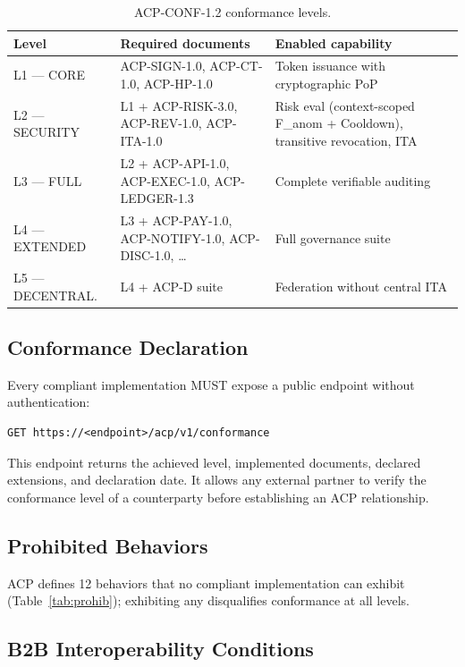 \documentclass[11pt]{article}
\theoremstyle{definition}
\begin{document}
\begin{table}[h!]
\centering
\small
\begin{tabular}{@{}lp{5.2cm}p{3.8cm}@{}}
\toprule
\textbf{Level} & \textbf{Required documents} & \textbf{Enabled capability} \\
\midrule
L1 --- CORE & ACP-SIGN-1.0, ACP-CT-1.0, ACP-HP-1.0 & Token issuance with cryptographic PoP \\
L2 --- SECURITY & L1 + ACP-RISK-3.0, ACP-REV-1.0, ACP-ITA-1.0 & Risk eval (context-scoped F\_anom + Cooldown), transitive revocation, ITA \\
L3 --- FULL & L2 + ACP-API-1.0, ACP-EXEC-1.0, ACP-LEDGER-1.3 & Complete verifiable auditing \\
L4 --- EXTENDED & L3 + ACP-PAY-1.0, ACP-NOTIFY-1.0, ACP-DISC-1.0, \ldots & Full governance suite \\
L5 --- DECENTRAL. & L4 + ACP-D suite & Federation without central ITA \\
\bottomrule
\end{tabular}
\caption{ACP-CONF-1.2 conformance levels.}
\end{table}

\subsection{Conformance Declaration}

Every compliant implementation MUST expose a public endpoint without authentication:
\begin{lstlisting}
GET https://<endpoint>/acp/v1/conformance
\end{lstlisting}
This endpoint returns the achieved level, implemented documents, declared extensions, and declaration date.
It allows any external partner to verify the conformance level of a counterparty before establishing an ACP relationship.

\subsection{Prohibited Behaviors}

ACP defines 12 behaviors that no compliant implementation can exhibit (Table~\ref{tab:prohib});
exhibiting any disqualifies conformance at all levels.

\subsection{B2B Interoperability Conditions}
\end{document}
